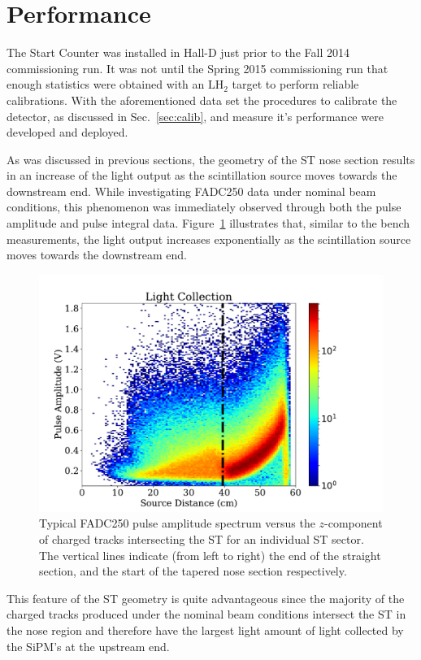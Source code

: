 \section{Performance} \label{sec:perform}

The Start Counter was installed in Hall-D just prior to the Fall 2014 \gx{} commissioning run.  It was not until the Spring 2015 commissioning run that enough statistics were obtained with an $\mathrm{LH_{2}}$ target to perform reliable calibrations.  With the aforementioned data set the procedures to calibrate the detector, as discussed in Sec.~\ref{sec:calib}, and measure it's performance were developed and deployed.

As was discussed in previous sections, the geometry of the ST nose section results in an increase of the light output as the scintillation source moves towards the downstream end.  While investigating FADC250 data under nominal beam conditions, this phenomenon was immediately observed through both the pulse amplitude and pulse integral data. Figure~\ref{fig:pippvszint} illustrates that, similar to the bench measurements, the light output increases exponentially as the scintillation source moves towards the downstream end.
	\begin{figure}[!htb]
		\centering
		\includegraphics[width=1.0\columnwidth]{performance/figs/pa_vs_zint}
		\caption{Typical FADC250 pulse amplitude spectrum versus the $z$-component of charged tracks intersecting the ST for an individual ST sector. The vertical lines  indicate (from left to right) the end of the straight section, and the start of the tapered nose section respectively.}
		\label{fig:pippvszint}
	\end{figure}
This feature of the ST geometry is quite advantageous since the majority of the charged tracks produced under the nominal \gx{} beam conditions intersect the ST in the nose region and therefore have the largest light amount of light collected by the SiPM's at the upstream end.

